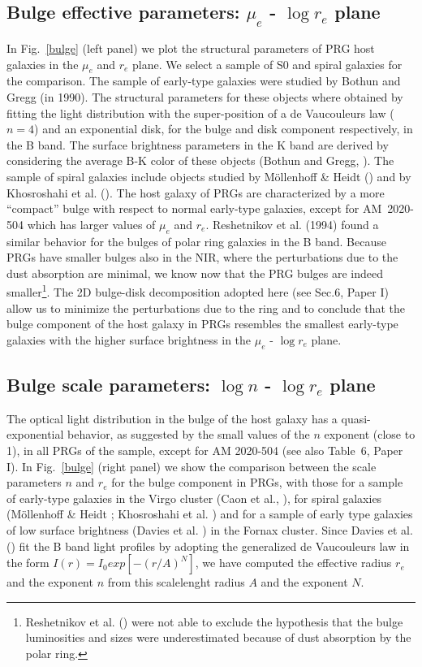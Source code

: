 \documentclass{aa}
\begin{document}
\subsection{Bulge effective parameters: $\mu_{e}$ - $\log r_{e}$ 
plane}\label{param_hg1}
In Fig.~\ref{bulge} (left panel) we plot the structural parameters of PRG  
host galaxies in the $\mu_{e}$ and $r_{e}$ plane.
We select a sample of S0 and spiral galaxies for the comparison. 
The sample of early-type galaxies were studied by Bothun and Gregg (in 1990).
The structural parameters for these
objects where obtained by fitting the light distribution with the 
super-position of a de Vaucouleurs law ($n=4$) and an exponential disk, 
for the bulge and disk component respectively, in the B band. 
The surface brightness parameters in the K band are derived by considering 
the average B-K color of these objects (Bothun and Gregg, \cite{Bothun90}).
The sample of spiral galaxies include objects studied by M\"{o}llenhoff 
\& Heidt (\cite{mollenhoff2001}) and by Khosroshahi et al. (\cite{khos2000b}). 
The host galaxy of PRGs are characterized by a more ``compact'' bulge with  
respect to normal early-type galaxies, except for AM~2020-504 which 
has larger values of $\mu_{e}$ and $r_{e}$. 
Reshetnikov et al. (1994) found a similar behavior for the bulges
of polar ring galaxies in the B band. Because PRGs have smaller bulges
also in the NIR, where the perturbations due to the dust absorption are
minimal, we know now that the PRG bulges are indeed
smaller\footnote{ Reshetnikov et al. (\cite{Resh94}) were not able to
exclude the hypothesis that the bulge luminosities and sizes were
underestimated because of dust absorption by the polar ring.}.
The 2D bulge-disk decomposition adopted here (see Sec.6, Paper I) 
allow us to minimize the perturbations due to the ring and to conclude 
that the bulge component of the host galaxy in PRGs resembles the smallest
early-type galaxies with the higher surface brightness in the $\mu_{e}$
- $\log r_{e}$ plane.

\subsection{Bulge scale parameters: $\log n$ - $\log r_{e}$ 
plane}\label{param_hg2}
The optical light distribution in the bulge of the host galaxy has a
quasi-exponential behavior, as suggested by the small values of the $n$ 
exponent (close to 1), in all PRGs of the sample, except for AM 2020-504 
(see also Table~6, Paper I). 
In Fig.~\ref{bulge} (right panel) we show the comparison between the scale 
parameters  $n$ and $ r_{e}$ for the bulge component in PRGs, with those
for a sample of early-type galaxies in the  Virgo cluster (Caon et al.,
\cite{Caon93}), for spiral galaxies (M\"{o}llenhoff \& Heidt 
\cite{mollenhoff2001}; Khosroshahi et al. \cite{khos2000b}) and
for a sample of early type 
galaxies of low surface brightness (Davies et al. \cite{Davies88}) 
in the Fornax cluster. Since Davies et al. (\cite{Davies88}) fit the B 
band light profiles by adopting the generalized de Vaucouleurs law in the
form  $I(r)=I_{0}exp[-(r/A)^{N}]$, we have computed the effective radius
$r_{e}$  and the exponent $n$ from this scalelenght radius $A$ and the
exponent $N$. 
\end{document}
